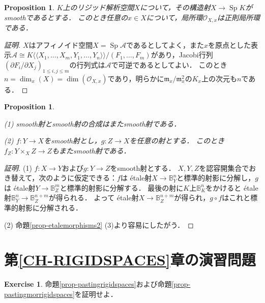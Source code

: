 \documentclass[a4paper,12pt, dvipdfmx]{jsbook}
\def\B{\mathbb{B}}
\def\O{\mathscr{O}}
\def\m{\mathfrak{m}}
\def\Sp{\mathop{\mathrm{Sp}}\nolimits}
\def\dl{\langle\!\langle}
\def\dr{\rangle\!\rangle}
\theoremstyle{plain}
\newtheorem{prop}[thm]{\bfseries Proposition}
\theoremstyle{definition}
\newtheorem{exer}{\bfseries Exercise}[chapter]
\begin{document}
\begin{prop}\label{prop-smoothmorphisms4}{\rm 
$K$上のリジッド解析空間$X$について，その構造射$X\rightarrow\Sp K$がsmoothであるとする．
このとき任意の$x\in X$について，局所環$\O_{X,x}$は正則局所環である．}
\end{prop}

\begin{proof}[証明]
$X$はアフィノイド空間$X=\Sp\mathcal{A}$であるとしてよく，また$x$を原点とした表示$\mathcal{A}\cong K\dl X_1,\ldots,X_m, Y_1,\ldots,Y_n\dr/(F_1,\ldots,F_m)$があり，Jacobi行列$(\partial F_i/\partial X_j)_{1\leq i,j\leq m}$の行列式は$\mathcal{A}$で可逆であるとしてよい．
このとき$n=\dim_x(X)=\dim(\O_{X,x})$であり，明らかに$\m_x/\m^2_x$の$K_x$上の次元も$n$である．
\end{proof}

\begin{prop}\label{prop-smoothmorphisms3}{\rm 
(1) smooth射とsmooth射の合成はまたsmooth射である．

(2) $f\colon Y\rightarrow X$をsmooth射とし，$g\colon Z\rightarrow X$を任意の射とする．
このとき$f_Z\colon Y\times_XZ\rightarrow Z$もまたsmooth射である．}
\end{prop}

\begin{proof}[証明]
(1) $f\colon X\rightarrow Y$および$g\colon Y\rightarrow Z$をsmooth射とする．
$X,Y,Z$を認容開集合でおき替えて，次のように仮定できる：$f$は \'etale射$X\rightarrow\B^n_Y$と標準的射影に分解し，$g$は \'etale射$Y\rightarrow\B^m_Z$と標準的射影に分解する．
最後の射に$K$上$\B^n_K$をかけると \'etale射$\B^n_Y\rightarrow\B^{n+m}_Z$が得られる．
よって \'etale射$X\rightarrow\B^{n+m}_Z$が得られ，$g\circ f$はこれと標準的射影に分解される．

(2) 命題\ref{prop-etalemorphisms2} (3)より容易にしたがう．
\end{proof}

\section*{第\ref{CH-RIGIDSPACES}章の演習問題}
\begin{exer}\label{exer-pastingrigidspaces}{\rm 
命題\ref{prop-pastingrigidspaces}および命題\ref{prop-pastingmorrigidspaces}を証明せよ．}
\end{exer}
\end{document}
